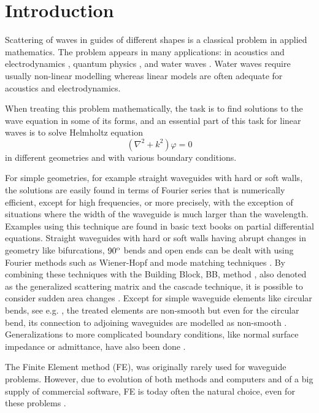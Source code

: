 \documentclass[numreferences]{kluwer}
\renewcommand{\phi}{\varphi}
\begin{document}
\section{Introduction}
\label{sec:intro}

Scattering of waves in guides of different shapes is a classical
problem in applied mathematics. The problem appears in many
applications: in acoustics and electrodynamics
\cite{jones1986,jin:2010}, quantum physics
\cite{londegan+carini+murdock:1999}, and water waves
\cite{abbott:1956,aimen+michelle+theodore:1998}. Water waves require
usually non-linear modelling whereas linear models are often adequate
for acoustics and electrodynamics.

When treating this problem mathematically, the task is to find
solutions to the wave equation in some of its forms, and an essential
part of this task for linear waves is to solve Helmholtz equation
\begin{equation}
  \label{eq:Helmholtz1}
  (\nabla^2+k^2)\phi=0
\end{equation}
in different geometries and with various boundary conditions.

For simple geometries, for example straight waveguides with hard or
soft walls, the solutions are easily found in terms of Fourier series
that is numerically efficient, except for high frequencies, or more
precisely, with the exception of situations where the width of the
waveguide is much larger than the wavelength. Examples using this
technique are found in basic text books on partial differential
equations. Straight waveguides with hard or soft walls having abrupt
changes in geometry like bifurcations, $90^{\tiny{\rm o}}$ bends and
open ends can be dealt with using Fourier methods such as Wiener-Hopf
and mode matching techniques \cite{mittralee1971}. By combining these
techniques with the Building Block, BB, method
\cite{nilssonbrander1981b}, also denoted as the generalized scattering
matrix \cite{mittralee1971} and the cascade \cite{jones1986}
technique, it is possible to consider sudden area changes
\cite{mittralee1971,nilssonbrander1981b}. Except for simple waveguide
elements like circular bends, see e.g. \cite{bironilsson2005}, the
treated elements are non-smooth but even for the circular bend, its
connection to adjoining waveguides are modelled as non-smooth
\cite{bironilsson2005}. Generalizations to more complicated boundary
conditions, like normal surface impedance or admittance, have also
been done \cite{buyukaksoycinar2005}.

The Finite Element method (FE), was originally rarely used for
waveguide problems. However, due to evolution of both methods and
computers and of a big supply of commercial software, FE is today often
the natural choice, even for these problems
\cite{zienkiewicz+taylor+zhu:2008,Ihlenburg:1998}. 
\end{document}

